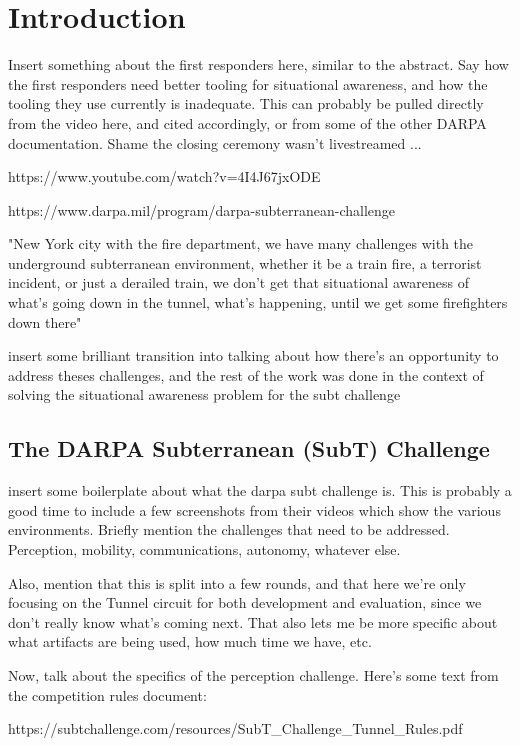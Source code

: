 \chapter{Introduction}

Insert something about the first responders here, similar to the abstract. Say how the first responders need better tooling for situational awareness, and how the tooling they use currently is inadequate. This can probably be pulled directly from the video here, and cited accordingly, or from some of the other DARPA documentation. Shame the closing ceremony wasn't livestreamed ...

https://www.youtube.com/watch?v=4I4J67jxODE

https://www.darpa.mil/program/darpa-subterranean-challenge

"New York city with the fire department, we have many challenges with the underground subterranean environment, whether it be a train fire, a terrorist incident, or just a derailed train, we don't get that situational awareness of what's going down in the tunnel, what's happening, until we get some firefighters down there"

insert some brilliant transition into talking about how there's an opportunity to address theses challenges, and the rest of the work was done in the context of solving the situational awareness problem for the subt challenge

\section{The DARPA Subterranean (SubT) Challenge}

insert some boilerplate about what the darpa subt challenge is. This is probably a good time to include a few screenshots from their videos which show the various environments. Briefly mention the challenges that need to be addressed. Perception, mobility, communications, autonomy, whatever else.

Also, mention that this is split into a few rounds, and that here we're only focusing on the Tunnel circuit for both development and evaluation, since we don't really know what's coming next. That also lets me be more specific about what artifacts are being used, how much time we have, etc.

Now, talk about the specifics of the perception challenge. Here's some text from the competition rules document:

https://subtchallenge.com/resources/SubT\_Challenge\_Tunnel\_Rules.pdf

